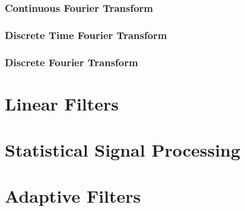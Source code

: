\subsubsection{Continuous Fourier Transform}



\subsubsection{Discrete Time Fourier Transform}

\subsubsection{Discrete Fourier Transform}


\section{Linear Filters}


\section{Statistical Signal Processing}



\section{Adaptive Filters}
